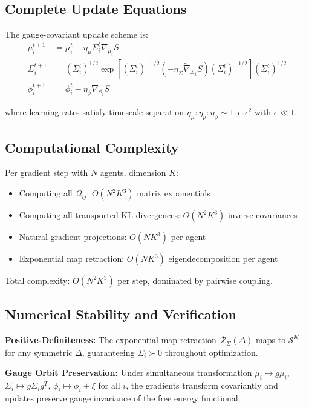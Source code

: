 \documentclass[11pt]{article}
\begin{document}
\subsection*{Complete Update Equations}

The gauge-covariant update scheme is:
\begin{align}
\mu_i^{t+1} &= \mu_i^t - \eta_\mu \Sigma_i^t \nabla_{\mu_i} S \\
\Sigma_i^{t+1} &= \left(\Sigma_i^t\right)^{1/2} \exp\left[\left(\Sigma_i^t\right)^{-1/2}\left(-\eta_\Sigma \tilde{\nabla}_{\Sigma_i} S\right)\left(\Sigma_i^t\right)^{-1/2}\right] \left(\Sigma_i^t\right)^{1/2} \\
\phi_i^{t+1} &= \phi_i^t - \eta_\phi \nabla_{\phi_i} S
\end{align}

where learning rates satisfy timescale separation $\eta_\mu : \eta_p : \eta_\phi \sim 1 : \epsilon : \epsilon^2$ with $\epsilon \ll 1$.

\subsection*{Computational Complexity}

Per gradient step with $N$ agents, dimension $K$:
\begin{itemize}
\item Computing all $\Omega_{ij}$: $O(N^2 K^3)$ matrix exponentials
\item Computing all transported KL divergences: $O(N^2 K^3)$ inverse covariances
\item Natural gradient projections: $O(NK^3)$ per agent
\item Exponential map retraction: $O(NK^3)$ eigendecomposition per agent
\end{itemize}

Total complexity: $O(N^2 K^3)$ per step, dominated by pairwise coupling.

\subsection*{Numerical Stability and Verification}

\textbf{Positive-Definiteness:} The exponential map retraction $\mathcal{R}_{\Sigma}(\Delta)$ maps to $\mathcal{S}_{++}^K$ for any symmetric $\Delta$, guaranteeing $\Sigma_i \succ 0$ throughout optimization.

\textbf{Gauge Orbit Preservation:} Under simultaneous transformation $\mu_i \mapsto g\mu_i$, $\Sigma_i \mapsto g\Sigma_i g^T$, $\phi_i \mapsto \phi_i + \xi$ for all $i$, the gradients transform covariantly and updates preserve gauge invariance of the free energy functional.
\end{document}
